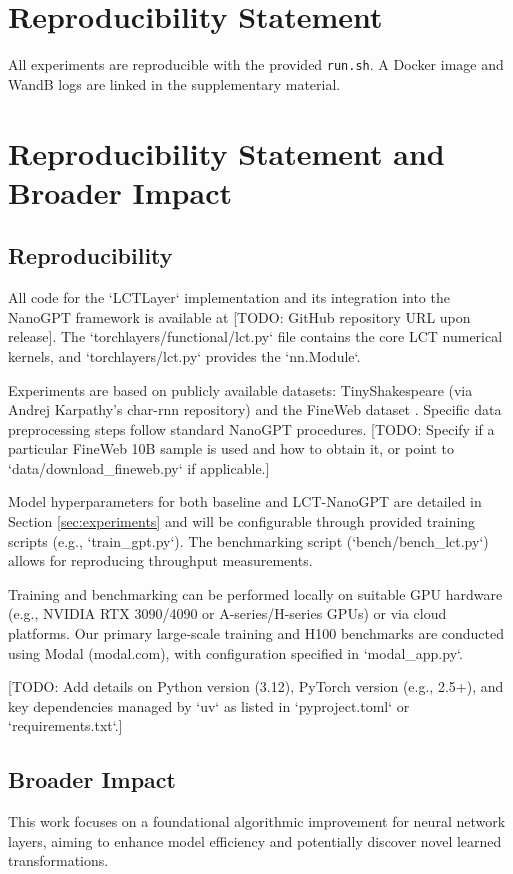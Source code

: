 \section*{Reproducibility Statement}
All experiments are reproducible with the provided \texttt{run.sh}.  A Docker image and WandB logs are linked in the supplementary material.

\section{Reproducibility Statement and Broader Impact}
\label{sec:repro_impact}

\subsection*{Reproducibility}
All code for the `LCTLayer` implementation and its integration into the NanoGPT framework is available at [TODO: GitHub repository URL upon release]. The `torchlayers/functional/lct.py` file contains the core LCT numerical kernels, and `torchlayers/lct.py` provides the `nn.Module`.

Experiments are based on publicly available datasets: TinyShakespeare (via Andrej Karpathy's char-rnn repository) and the FineWeb dataset \citep{FineWeb}. Specific data preprocessing steps follow standard NanoGPT procedures. [TODO: Specify if a particular FineWeb 10B sample is used and how to obtain it, or point to `data/download_fineweb.py` if applicable.]

Model hyperparameters for both baseline and LCT-NanoGPT are detailed in Section \ref{sec:experiments} and will be configurable through provided training scripts (e.g., `train_gpt.py`). The benchmarking script (`bench/bench_lct.py`) allows for reproducing throughput measurements.

Training and benchmarking can be performed locally on suitable GPU hardware (e.g., NVIDIA RTX 3090/4090 or A-series/H-series GPUs) or via cloud platforms. Our primary large-scale training and H100 benchmarks are conducted using Modal (modal.com), with configuration specified in `modal_app.py`.

[TODO: Add details on Python version (3.12), PyTorch version (e.g., 2.5+), and key dependencies managed by `uv` as listed in `pyproject.toml` or `requirements.txt`.]

\subsection*{Broader Impact}
This work focuses on a foundational algorithmic improvement for neural network layers, aiming to enhance model efficiency and potentially discover novel learned transformations.

